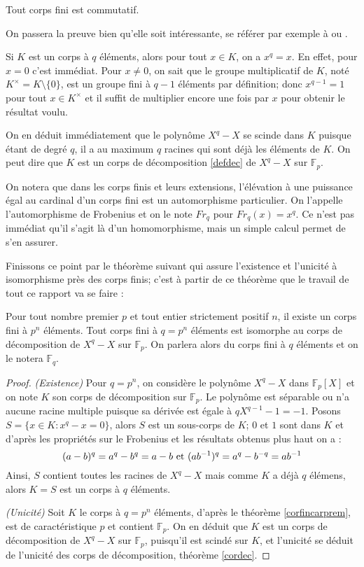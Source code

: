 \documentclass[a4paper]{article} %
\numberwithin{equation}{section}
\newcommand\GF[1]{\mathbb{F}_{#1}}
\begin{document}
\begin{thm}[Wedderburn]
Tout corps fini est commutatif.
\end{thm}
On passera la preuve bien qu'elle soit intéressante, se référer par exemple à 
\cite[p.~70-73]{LiNi} ou \cite[p.~82]{Per}.\par
\vspace{0.3cm}
Si $K$ est un corps à $q$ éléments, alors pour tout $x\in K$, on a $x^q = x$. En
effet, pour $x = 0$ c'est immédiat. Pour $x\neq 0$, on sait que le groupe
multiplicatif de $K$, noté $K^{\times} = K\setminus\lbrace0\rbrace$, est un
groupe fini à $q-1$ éléments par définition; donc $x^{q-1} = 1$ pour tout $x\in
K^{\times}$ et il suffit de multiplier encore une fois par $x$ pour obtenir le
résultat voulu.\par
On en déduit immédiatement que le polynôme $X^q - X$ se scinde dans $K$
puisque étant de degré $q$, il a au maximum $q$ racines qui sont déjà les
éléments de $K$. On peut dire que $K$ est un corps de décomposition
\ref{defdec} de $X^q - X$ sur $\GF{p}$.\par
On notera que dans les corps finis et leurs extensions, l'élévation à une
puissance égal au cardinal d'un corps fini est un automorphisme particulier. On
l'appelle l'automorphisme de Frobenius et on le note $Fr_q$ pour $Fr_q(x) =
x^q$. Ce n'est pas immédiat qu'il s'agit là d'un homomorphisme, mais un simple
calcul permet de s'en assurer.\par
\vspace{0.3cm}
Finissons ce point par le théorème suivant qui assure l'existence et l'unicité
à isomorphisme près des corps finis; c'est à partir de ce théorème que le
travail de tout ce rapport va se faire :

\begin{thm}
\label{thisomGF}
Pour tout nombre premier $p$ et tout entier strictement positif $n$, il existe 
un corps fini à $p^n$ éléments. Tout corps fini à $q = p^n$ éléments est 
isomorphe au corps de décomposition de $X^q - X$ sur $\GF{p}$. On parlera alors 
du corps fini à $q$ éléments et on le notera $\GF{q}$.
\end{thm}
\begin{proof}
\textit{(Existence)} Pour $q = p^n$, on considère le polynôme $X^q - X$ dans 
$\GF{p}[X]$ et on note $K$ son corps de décomposition sur $\GF{p}$. Le polynôme 
est séparable ou n'a aucune racine multiple puisque sa dérivée est égale à 
$qX^{q-1} - 1 = -1$. Posons $S = \lbrace x\in K : x^q - x = 0\rbrace$, alors $S$
est un sous-corps de $K$; $0$ et $1$ sont dans $K$ et d'après les propriétés sur
le Frobenius et les résultats obtenus plus haut on a :
\[(a - b)^q = a^q - b^q = a - b \textup{ et }(ab^{-1})^q = a^q - b^{-q} =
ab^{-1}\]
Ainsi, $S$ contient toutes les racines de $X^q - X$ mais comme $K$ a déjà $q$
élémens, alors $K = S$ est un corps à $q$ éléments.\par
\textit{(Unicité)} Soit $K$ le corps à $q = p^n$ éléments, d'après le théorème
\ref{corfincarprem}, est de caractéristique $p$ et contient $\GF{p}$. On en
déduit que $K$ est un corps de décomposition de $X^q - X$ sur $\GF{p}$,
puisqu'il est scindé sur $K$, et l'unicité se déduit de l'unicité des corps de
décomposition, théorème \ref{cordec}.
\end{proof}
\end{document}
